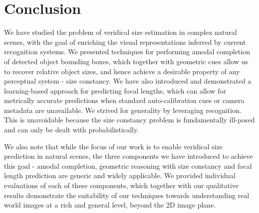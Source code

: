 \section{Conclusion}
We have studied the problem of veridical size estimation in complex natural scenes, with the goal of enriching the visual representations inferred by current recognition systems. We presented techniques for performing amodal completion of detected object bounding boxes, which together with geometric cues allow us to recover relative object sizes, and hence achieve a desirable property of any perceptual system - size constancy. We have also introduced and demonstrated a learning-based approach for predicting focal lengths, which can allow for metrically accurate predictions when standard auto-calibration cues or camera metadata are unavailable. We strived for generality by leveraging recognition. This is unavoidable because the size constancy problem is fundamentally ill-posed and can only be dealt with probabilistically.

We also note that while the focus of our work is to enable veridical size prediction in natural scenes, the three components we have introduced to achieve this goal - amodal completion, geometric reasoning with size constancy and focal length prediction are generic and widely applicable. We provided individual evaluations of each of these components, which together with our qualitative results demonstrate the suitability of our techniques towards understanding real world images at a rich and general level, beyond the 2D image plane.